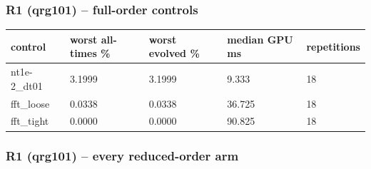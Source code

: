\documentclass[11pt]{article}
\begin{document}
\subsubsection{R1 (qrg101) -- full-order controls}
\begin{table}[htbp]\centering\small
\begin{tabular}{lllll}\hline
control & worst all-times \% & worst evolved \% & median GPU ms & repetitions \\ \hline
nt1e-2\_dt01 & 3.1999 & 3.1999 & 9.333 & 18 \\
fft\_loose & 0.0338 & 0.0338 & 36.725 & 18 \\
fft\_tight & 0.0000 & 0.0000 & 90.825 & 18 \\
\hline\end{tabular}
\end{table}
\subsubsection{R1 (qrg101) -- every reduced-order arm}
\end{document}
